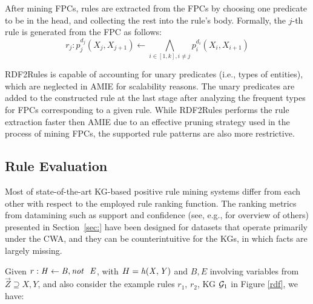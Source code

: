 After mining FPCs, rules are extracted from the FPCs by choosing one %
predicate to be in    %
the head, and collecting the rest into the rule's  body. 
Formally, the  $j$-th rule is generated from the FPC as follows:
\[r_j: p_j^{d_j}(X_j,X_{j+1}) \leftarrow \underset{i \in [1,k], i \ne j}{\bigwedge} p_i^{d_i}(X_i,X_{i+1}) \]

RDF2Rules is capable of accounting for unary predicates (i.e., types of entities), which are neglected in AMIE for scalability reasons. %
The unary predicates are added to the constructed rule at the last stage after analyzing the 
frequent types for FPCs corresponding to a given rule.
While RDF2Rules performs the rule extraction faster then AMIE due to an effective pruning strategy
used in the process of mining FPCs, the supported rule patterns are also more restrictive. 

\subsection{Rule Evaluation}
Most of state-of-the-art KG-based positive rule mining systems %
differ from each other with respect to the employed %
rule ranking function. %
The ranking metrics from datamining such as support and confidence (see, e.g., \cite{metrics-summary} for overview of others) presented in Section~\ref{sec:} have been designed for datasets that operate primarily under the CWA, and they can be counterintuitive for the KGs, in which facts are largely missing.  %

Given $r:\mi{H\leftarrow B, \naf\ E}$, with $H=\mathit{h(X,Y)}$ and $B,E$ involving variables from $\vec{Z}\supseteq X,Y$, and also consider the example rules $r_1$, $r_2$, KG $\mathcal{G}_1$ in Figure \ref{rdf}, we have:
